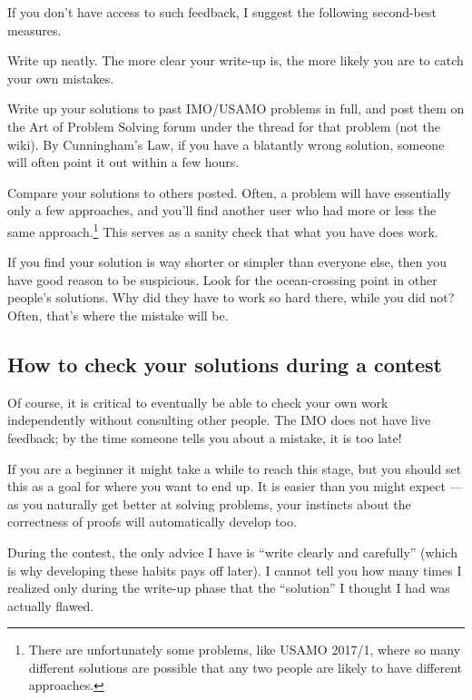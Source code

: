 If you don't have access to such feedback,
I suggest the following second-best measures.
\begin{itemize}
	\ii Write up neatly.
	The more clear your write-up is,
	the more likely you are to catch your own mistakes.

	\ii Write up your solutions to past IMO/USAMO problems in full,
	and post them on the Art of Problem Solving forum
	under the thread for that problem (not the wiki).
	By Cunningham's Law, if you have a blatantly wrong solution,
	someone will often point it out within a few hours.

	\ii Compare your solutions to others posted.
	Often, a problem will have essentially only a few approaches,
	and you'll find another user who had more or less
	the same approach.\footnote{There are unfortunately some problems,
		like USAMO 2017/1,
		where so many different solutions are possible
		that any two people are likely to have different approaches.}
	This serves as a sanity check that what you have does work.

	If you find your solution is way shorter or simpler
	than everyone else, then you have good reason to be suspicious.
	Look for the ocean-crossing point in other people's solutions.
	Why did they have to work so hard there, while you did not?
	Often, that's where the mistake will be.
\end{itemize}

\subsection{How to check your solutions during a contest}
Of course, it is critical to eventually
be able to check your own work independently
without consulting other people.
The IMO does not have live feedback;
by the time someone tells you about a mistake, it is too late!

If you are a beginner it might take a while to reach this stage,
but you should set this as a goal for where you want to end up.
It is easier than you might expect ---
as you naturally get better at solving problems, your instincts
about the correctness of proofs will automatically develop too.

During the contest, the only advice I have is
``write clearly and carefully''
(which is why developing these habits pays off later).
I cannot tell you how many times I realized only during the write-up phase
that the ``solution'' I thought I had was actually flawed.
